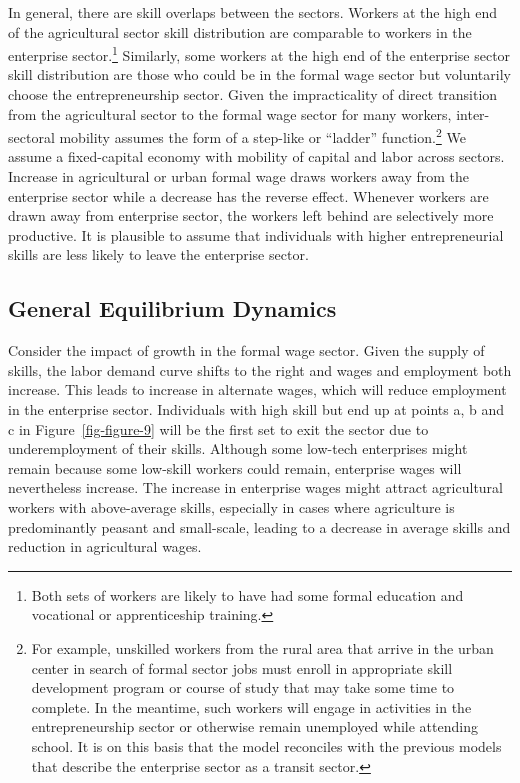\documentclass[
  a4paper,
  DIV=11,
  numbers=noendperiod]{scrartcl}
\begin{document}
In general, there are skill overlaps between the sectors. Workers at the
high end of the agricultural sector skill distribution are comparable to
workers in the enterprise sector.\footnote{Both sets of workers are
  likely to have had some formal education and vocational or
  apprenticeship training.} Similarly, some workers at the high end of
the enterprise sector skill distribution are those who could be in the
formal wage sector but voluntarily choose the entrepreneurship sector.
Given the impracticality of direct transition from the agricultural
sector to the formal wage sector for many workers, inter-sectoral
mobility assumes the form of a step-like or ``ladder''
function.\footnote{For example, unskilled workers from the rural area
  that arrive in the urban center in search of formal sector jobs must
  enroll in appropriate skill development program or course of study
  that may take some time to complete. In the meantime, such workers
  will engage in activities in the entrepreneurship sector or otherwise
  remain unemployed while attending school. It is on this basis that the
  model reconciles with the previous models that describe the enterprise
  sector as a transit sector.} We assume a fixed-capital economy with
mobility of capital and labor across sectors. Increase in agricultural
or urban formal wage draws workers away from the enterprise sector while
a decrease has the reverse effect. Whenever workers are drawn away from
enterprise sector, the workers left behind are selectively more
productive. It is plausible to assume that individuals with higher
entrepreneurial skills are less likely to leave the enterprise sector.

\hypertarget{general-equilibrium-dynamics}{%
\subsection{General Equilibrium
Dynamics}\label{general-equilibrium-dynamics}}

Consider the impact of growth in the formal wage sector. Given the
supply of skills, the labor demand curve shifts to the right and wages
and employment both increase. This leads to increase in alternate wages,
which will reduce employment in the enterprise sector. Individuals with
high skill but end up at points a, b and c in Figure~\ref{fig-figure-9}
will be the first set to exit the sector due to underemployment of their
skills. Although some low-tech enterprises might remain because some
low-skill workers could remain, enterprise wages will nevertheless
increase. The increase in enterprise wages might attract agricultural
workers with above-average skills, especially in cases where agriculture
is predominantly peasant and small-scale, leading to a decrease in
average skills and reduction in agricultural wages.
\end{document}
